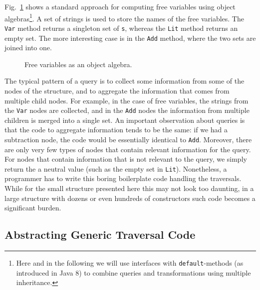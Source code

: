 Fig.~\ref{freevars_without_monoid} shows a
standard approach for computing free variables using object algebras\footnote{Here and in the following we will use interfaces with \lstinline{default}-methods (as introduced in Java 8) to combine queries and transformations using multiple inheritance.}.
A set of strings is used to store the names of the free variables. The
\lstinline{Var} method returns a singleton set of \lstinline{s},
whereas the \lstinline{Lit} method returns an empty set. The
more interesting case is in the \lstinline{Add} method, where the two
sets are joined into one.

\begin{figure}[t]
\vspace{-.1in}
\caption{Free variables as an object algebra.}
\label{freevars_without_monoid}
\end{figure}
\begin{comment}
\bruno{put code in a figure, add a caption and refer
  to the figure in the text.}
\end{comment}

The typical pattern of a query is to collect some information from
some of the nodes of the structure, and to aggregate the information
that comes from multiple child nodes. For example, in the case of free
variables, the strings from the \lstinline{Var} nodes are collected,
and in the \lstinline{Add} nodes the information from multiple
children is merged into a single set. An important observation about
queries is that the code to aggregate information tends to be the
same: if we had a subtraction node, the code would be essentially
identical to \lstinline{Add}. Moreover, there are only very few types
of nodes that contain relevant information for the query. For nodes
that contain information that is not relevant to the query, we simply
return the a neutral value (such as the empty set in \lstinline{Lit}).
Nonetheless, a programmer has to write this boring boilerplate code
handling the traversals.  While for the small structure presented here
this may not look too daunting, in a large structure with dozens or
even hundreds of constructors such code becomes a significant burden.


\subsection{Abstracting Generic Traversal Code}\label{subsec:genericquery}

